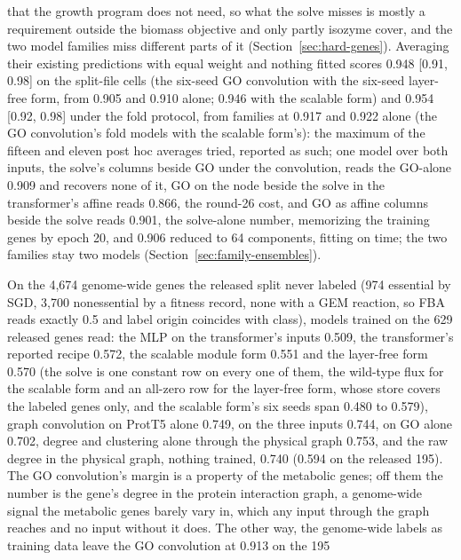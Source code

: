 \begin{description}
    that the growth program does not need, so what the solve misses is mostly a
    requirement outside the biomass objective and only partly isozyme cover, and the
    two model families miss different parts of it
    (Section~\ref{sec:hard-genes}). Averaging their existing predictions with equal
    weight and nothing fitted scores 0.948 [0.91, 0.98] on the split-file cells (the
    six-seed GO convolution with the six-seed layer-free form, from 0.905 and 0.910
    alone; 0.946 with the scalable form) and 0.954 [0.92, 0.98] under the fold
    protocol, from families at 0.917 and 0.922 alone (the GO convolution's fold models
    with the scalable form's): the maximum of the fifteen and eleven post hoc averages
    tried, reported as such; one model over both inputs, the solve's columns beside
    GO under the convolution, reads the GO-alone 0.909 and recovers none of it, GO on
    the node beside the solve in the transformer's affine reads 0.866, the round-26
    cost, and GO as affine columns beside the solve reads 0.901, the solve-alone
    number, memorizing the training genes by epoch 20, and 0.906 reduced to 64
    components, fitting on time; the two families stay two models
    (Section~\ref{sec:family-ensembles}).
  \item[Off the metabolic genes, only the graph transfers.] On the 4,674 genome-wide
    genes the released split never labeled (974 essential by SGD, 3,700 nonessential by
    a fitness record, none with a GEM reaction, so FBA reads exactly 0.5 and label
    origin coincides with class), models trained on the 629 released genes read: the
    MLP on the transformer's inputs 0.509, the transformer's reported recipe 0.572,
    the scalable module form 0.551 and the layer-free form 0.570 (the solve is one constant row on every one of them, the wild-type flux for the
    scalable form and an all-zero row for the layer-free form, whose store covers the
    labeled genes only, and the scalable form's six seeds span 0.480 to
    0.579),
    graph convolution on ProtT5 alone 0.749, on the three inputs 0.744, on GO alone
    0.702, degree and clustering alone through the physical graph 0.753, and the raw
    degree in the physical graph, nothing trained, 0.740 (0.594 on the released 195).
    The GO convolution's margin is a property of the metabolic genes; off them the
    number is the gene's degree in the protein interaction graph, a genome-wide signal
    the metabolic genes barely vary in, which any input through the graph reaches and
    no input without it does. The other way, the
    genome-wide labels as training data leave the GO convolution at 0.913 on the 195

\end{description}
